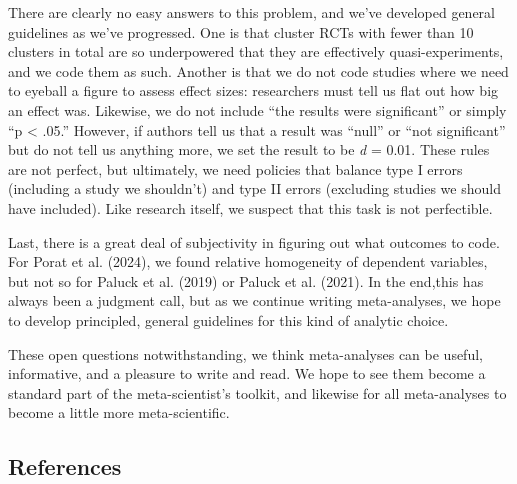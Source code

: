 \documentclass[
  man]{apa6}
\begin{document}
There are clearly no easy answers to this problem, and we've developed general guidelines as we've progressed. One is that cluster RCTs with fewer than 10 clusters in total are so underpowered that they are effectively quasi-experiments, and we code them as such. Another is that we do not code studies where we need to eyeball a figure to assess effect sizes: researchers must tell us flat out how big an effect was. Likewise, we do not include ``the results were significant'' or simply ``p \textless{} .05.'' However, if authors tell us that a result was ``null'' or ``not significant'' but do not tell us anything more, we set the result to be \emph{d} = 0.01. These rules are not perfect, but ultimately, we need policies that balance type I errors (including a study we shouldn't) and type II errors (excluding studies we should have included). Like research itself, we suspect that this task is not perfectible.

Last, there is a great deal of subjectivity in figuring out what outcomes to code. For Porat et al. (2024), we found relative homogeneity of dependent variables, but not so for Paluck et al. (2019) or Paluck et al. (2021). In the end,this has always been a judgment call, but as we continue writing meta-analyses, we hope to develop principled, general guidelines for this kind of analytic choice.

These open questions notwithstanding, we think meta-analyses can be useful, informative, and a pleasure to write and read. We hope to see them become a standard part of the meta-scientist's toolkit, and likewise for all meta-analyses to become a little more meta-scientific.

\subsection*{References}\label{references}
\end{document}
